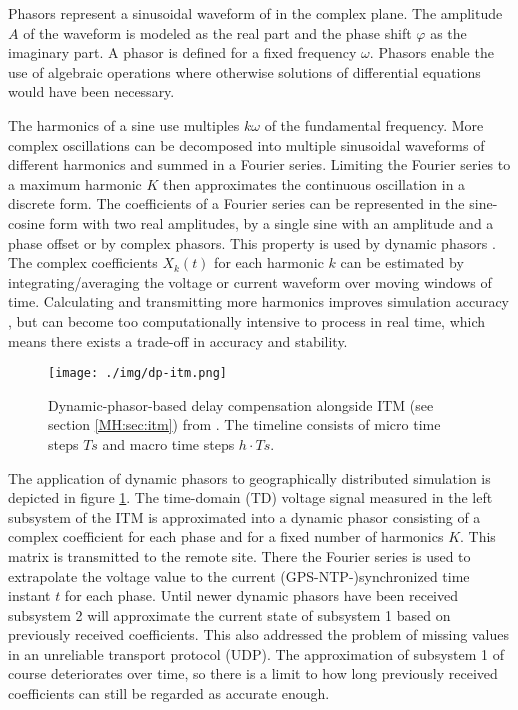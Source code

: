 \documentclass[a4paper]{atseminar}
\begin{document}
Phasors represent a sinusoidal waveform of in the complex plane. The amplitude $A$ of the waveform is modeled as the real part and the phase shift $\varphi$ as the imaginary part. A phasor is defined for a fixed frequency $\omega$.
Phasors enable the use of algebraic operations where otherwise solutions of differential equations would have been necessary.


The harmonics of a sine use multiples $k\omega$ of the fundamental frequency. More complex oscillations can be decomposed into multiple sinusoidal waveforms of different harmonics and summed in a Fourier series. Limiting the Fourier series to a maximum harmonic $K$ then approximates the continuous oscillation in a discrete form. The coefficients of a Fourier series can be represented in the sine-cosine form with two real amplitudes, by a single sine with an amplitude and a phase offset or by complex phasors. This property is used by dynamic phasors \cite{stankovic2002, mirz2017phasor, stevic2017fidelity}. The complex coefficients $X_k(t)$ for each harmonic $k$ can be estimated by integrating/averaging the voltage or current waveform over moving windows of time. %
Calculating and transmitting more harmonics improves simulation accuracy \cite{stevic2015sim, stevic2017europe}, but can become too computationally intensive to process in real time, which means there exists a trade-off in accuracy and stability.

\begin{figure}[h]
 \centering
  \texttt{[image: ./img/dp-itm.png]}
    \caption{Dynamic-phasor-based delay compensation alongside ITM (see section \ref{MH:sec:itm}) from \cite{stevic2017europe}. The timeline consists of micro time steps $Ts$ and macro time steps $h\cdot Ts$. }
 \label{MH:fig:dp}
\end{figure}

The application of dynamic phasors to geographically distributed simulation is depicted in figure \ref{MH:fig:dp}. 
The time-domain (TD) voltage signal measured in the left subsystem of the ITM is approximated into a dynamic phasor consisting of a complex coefficient for each phase and for a fixed number of harmonics $K$.  This matrix is transmitted to the remote site.
There the Fourier series is used to extrapolate the voltage value to the current (GPS-NTP-)synchronized time instant $t$ for each phase. Until newer dynamic phasors have been received subsystem 2 will approximate the current state of subsystem 1 based on previously received coefficients. This also addressed the problem of missing values in an unreliable transport protocol (UDP). The approximation of subsystem 1 of course deteriorates over time, so there is a limit to how long previously received coefficients can still be regarded as accurate enough.
\cite{stevic2017fidelity}
\end{document}
